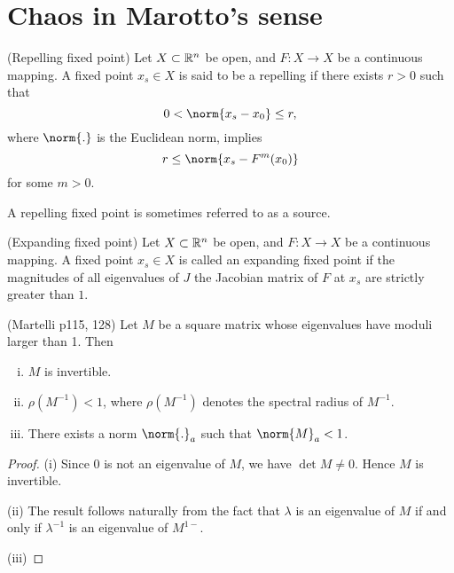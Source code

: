 \documentclass[11pt]{book}
\begin{document}
\section{Chaos in Marotto's sense}

\begin{definition}
  (Repelling fixed point)
  Let $X \subset \mathbb{R}^n$ be open, and $F: X \to X$ be a continuous mapping. 
  A fixed point $x_s \in X$ is said to be a repelling if there exists $r > 0$
  such that 
  \begin{equation*}
    0 < \norm{x_s - x_0} \leq r,
  \end{equation*}
  where $\norm{.}$ is the Euclidean norm, implies
\begin{equation*}
  r \leq \norm{x_s - F^m(x_0)}
\end{equation*}
for some $m > 0$.
\end{definition}
A repelling fixed point is sometimes referred to as a source.

\begin{definition}
  (Expanding fixed point)
  Let $X \subset \mathbb{R}^n$ be open, and $F: X \to X$ be a continuous mapping. 
  A fixed point $x_s \in  X$ is called an expanding fixed point if
  the magnitudes of all eigenvalues of $J$ the Jacobian matrix of $F$ at $x_s$ are strictly greater than $1$.
\end{definition}

\begin{lemma}
  (Martelli p115, 128)
  Let $M$ be a square matrix whose eigenvalues have moduli larger than 1.
  Then 
  \begin{enumerate}[(i)]
    \item $M$ is invertible.
    \item $\rho(M^{-1}) < 1$, where $\rho(M^{-1})$ denotes the spectral radius of $M^{-1}$.
    \item There exists a norm $\norm{.}_a$ such that $\norm{M}_a < 1$.
    
  \end{enumerate}
\end{lemma}
\begin{proof}
  (i) Since $0$ is not an eigenvalue of $M$, we have $\det M \neq 0$.
  Hence $M$ is invertible.

  (ii) The result follows naturally from the fact that
  $\lambda$ is an eigenvalue of $M$ if and only if $\lambda^{-1}$ is an eigenvalue of $M^{1-}$.

  (iii) 
\end{proof}
\end{document}
